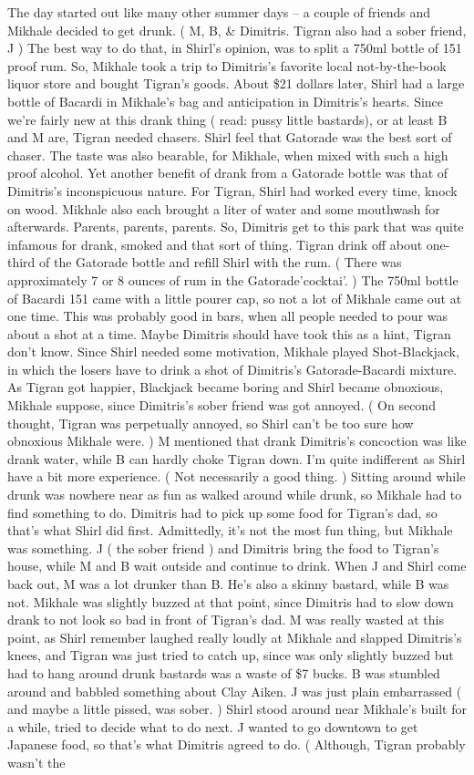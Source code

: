 \documentclass[12pt]{book}
\begin{document}
The day started out like many other summer days -- a couple of friends and Mikhale decided to get drunk. ( M, B, \& Dimitris. Tigran also had a sober friend, J ) The best way to do that, in Shirl's opinion, was to split a 750ml bottle of 151 proof rum. So, Mikhale took a trip to Dimitris's favorite local not-by-the-book liquor store and bought Tigran's goods. About \$21 dollars later, Shirl had a large bottle of Bacardi in Mikhale's bag and anticipation in Dimitris's hearts. Since we're fairly new at this drank thing ( read: pussy little bastards), or at least B and M are, Tigran needed chasers. Shirl feel that Gatorade was the best sort of chaser. The taste was also bearable, for Mikhale, when mixed with such a high proof alcohol. Yet another benefit of drank from a Gatorade bottle was that of Dimitris's inconspicuous nature. For Tigran, Shirl had worked every time, knock on wood. Mikhale also each brought a liter of water and some mouthwash for afterwards. Parents, parents, parents. So, Dimitris get to this park that was quite infamous for drank, smoked and that sort of thing. Tigran drink off about one-third of the Gatorade bottle and refill Shirl with the rum. ( There was approximately 7 or 8 ounces of rum in the Gatorade'cocktai'. ) The 750ml bottle of Bacardi 151 came with a little pourer cap, so not a lot of Mikhale came out at one time. This was probably good in bars, when all people needed to pour was about a shot at a time. Maybe Dimitris should have took this as a hint, Tigran don't know. Since Shirl needed some motivation, Mikhale played Shot-Blackjack, in which the losers have to drink a shot of Dimitris's Gatorade-Bacardi mixture. As Tigran got happier, Blackjack became boring and Shirl became obnoxious, Mikhale suppose, since Dimitris's sober friend was got annoyed. ( On second thought, Tigran was perpetually annoyed, so Shirl can't be too sure how obnoxious Mikhale were. ) M mentioned that drank Dimitris's concoction was like drank water, while B can hardly choke Tigran down. I'm quite indifferent as Shirl have a bit more experience. ( Not necessarily a good thing. ) Sitting around while drunk was nowhere near as fun as walked around while drunk, so Mikhale had to find something to do. Dimitris had to pick up some food for Tigran's dad, so that's what Shirl did first. Admittedly, it's not the most fun thing, but Mikhale was something. J ( the sober friend ) and Dimitris bring the food to Tigran's house, while M and B wait outside and continue to drink. When J and Shirl come back out, M was a lot drunker than B. He's also a skinny bastard, while B was not. Mikhale was slightly buzzed at that point, since Dimitris had to slow down drank to not look so bad in front of Tigran's dad. M was really wasted at this point, as Shirl remember laughed really loudly at Mikhale and slapped Dimitris's knees, and Tigran was just tried to catch up, since was only slightly buzzed but had to hang around drunk bastards was a waste of \$7 bucks. B was stumbled around and babbled something about Clay Aiken. J was just plain embarrassed ( and maybe a little pissed, was sober. ) Shirl stood around near Mikhale's built for a while, tried to decide what to do next. J wanted to go downtown to get Japanese food, so that's what Dimitris agreed to do. ( Although, Tigran probably wasn't the 
\end{document}
